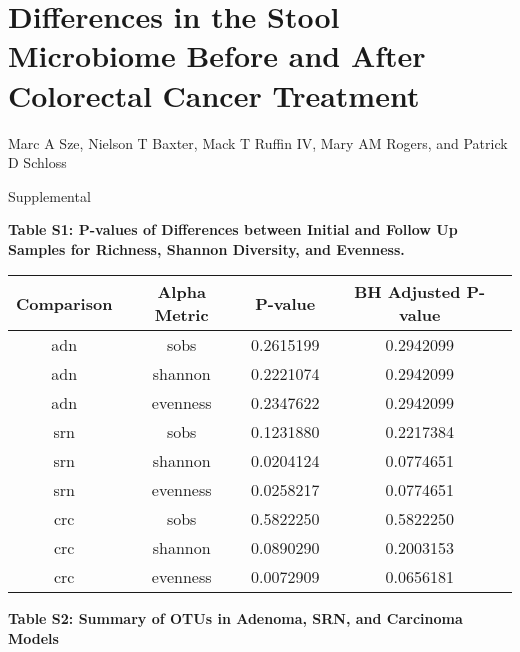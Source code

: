 \documentclass[12pt,]{article}
\title{}
\author{}
\date{}
\begin{document}
\section{Differences in the Stool Microbiome Before and After Colorectal
Cancer
Treatment}\label{differences-in-the-stool-microbiome-before-and-after-colorectal-cancer-treatment}

\vspace{10mm}

\begin{center}
Marc A Sze, Nielson T Baxter, Mack T Ruffin IV, Mary AM Rogers, and Patrick D Schloss

\vspace{10mm}

Supplemental
\end{center}

\newpage

\textbf{Table S1: P-values of Differences between Initial and Follow Up
Samples for Richness, Shannon Diversity, and Evenness.}

\begin{longtable}[]{@{}cccc@{}}
\toprule
Comparison & Alpha Metric & P-value & BH Adjusted P-value\tabularnewline
\midrule
\endhead
adn & sobs & 0.2615199 & 0.2942099\tabularnewline
adn & shannon & 0.2221074 & 0.2942099\tabularnewline
adn & evenness & 0.2347622 & 0.2942099\tabularnewline
srn & sobs & 0.1231880 & 0.2217384\tabularnewline
srn & shannon & 0.0204124 & 0.0774651\tabularnewline
srn & evenness & 0.0258217 & 0.0774651\tabularnewline
crc & sobs & 0.5822250 & 0.5822250\tabularnewline
crc & shannon & 0.0890290 & 0.2003153\tabularnewline
crc & evenness & 0.0072909 & 0.0656181\tabularnewline
\bottomrule
\end{longtable}

\newpage

\textbf{Table S2: Summary of OTUs in Adenoma, SRN, and Carcinoma Models}
\end{document}
